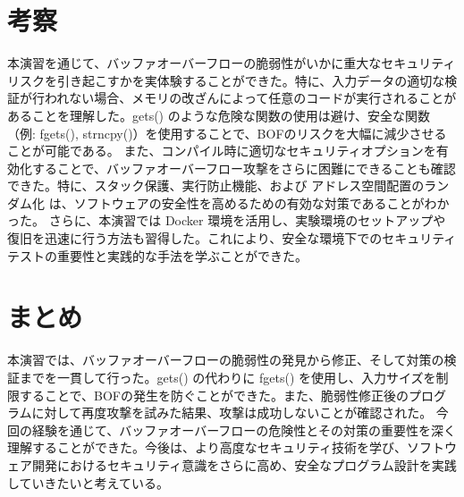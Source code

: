 \documentclass{jlreq}
\begin{document}
\section{考察}
本演習を通じて、バッファオーバーフローの脆弱性がいかに重大なセキュリティリスクを引き起こすかを実体験することができた。特に、入力データの適切な検証が行われない場合、メモリの改ざんによって任意のコードが実行されることがあることを理解した。gets() のような危険な関数の使用は避け、安全な関数（例: fgets(), strncpy()）を使用することで、BOFのリスクを大幅に減少させることが可能である。
また、コンパイル時に適切なセキュリティオプションを有効化することで、バッファオーバーフロー攻撃をさらに困難にできることも確認できた。特に、スタック保護、実行防止機能、および アドレス空間配置のランダム化 は、ソフトウェアの安全性を高めるための有効な対策であることがわかった。
さらに、本演習では Docker 環境を活用し、実験環境のセットアップや復旧を迅速に行う方法も習得した。これにより、安全な環境下でのセキュリティテストの重要性と実践的な手法を学ぶことができた。


\section{まとめ}
本演習では、バッファオーバーフローの脆弱性の発見から修正、そして対策の検証までを一貫して行った。gets() の代わりに fgets() を使用し、入力サイズを制限することで、BOFの発生を防ぐことができた。また、脆弱性修正後のプログラムに対して再度攻撃を試みた結果、攻撃は成功しないことが確認された。
今回の経験を通じて、バッファオーバーフローの危険性とその対策の重要性を深く理解することができた。今後は、より高度なセキュリティ技術を学び、ソフトウェア開発におけるセキュリティ意識をさらに高め、安全なプログラム設計を実践していきたいと考えている。
\end{document}
